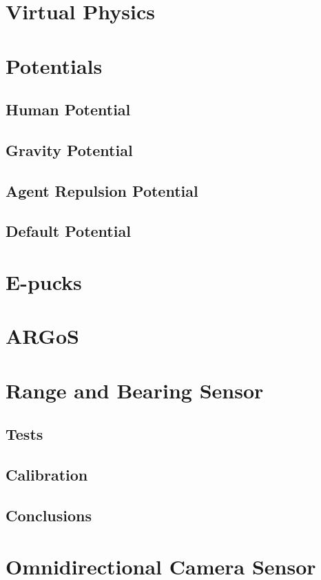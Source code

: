\documentclass[a4paper, 12pt]{report}
\begin{document}
	\section{Virtual Physics}
	\section{Potentials}
		\subsection{Human Potential}
		\subsection{Gravity Potential}
		\subsection{Agent Repulsion Potential}
		\subsection{Default Potential}
		
	\section{E-pucks}
	
	\section{ARGoS}
	
	\section{Range and Bearing Sensor}
		\subsection{Tests}
		\subsection{Calibration}
		\subsection{Conclusions}

	\section{Omnidirectional Camera Sensor}
\end{document}
